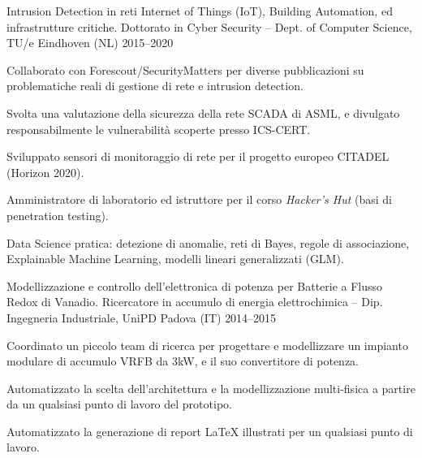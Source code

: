 
\begin{cventries}
    \cventry%
        {Intrusion Detection in reti Internet of Things (IoT), Building Automation, ed infrastrutture critiche.} %
        {Dottorato in Cyber Security -- Dept. of Computer Science, TU/e} %
        {Eindhoven (NL)} %
        {2015--2020} %
        {\begin{cvitems}
            \item Collaborato con Forescout/SecurityMatters per diverse pubblicazioni su problematiche reali di gestione di rete e intrusion detection.
            \item Svolta una valutazione della sicurezza della rete SCADA di ASML, e divulgato responsabilmente le vulnerabilità scoperte presso ICS-CERT.
            \item Sviluppato sensori di monitoraggio di rete per il progetto europeo CITADEL (Horizon 2020).
            \item Amministratore di laboratorio ed istruttore per il corso \emph{Hacker's Hut} (basi di penetration testing).
            \item Data Science pratica: detezione di anomalie, reti di Bayes, regole di associazione, Explainable Machine Learning, modelli lineari generalizzati (GLM).
        \end{cvitems}}


    \cventry%
        {Modellizzazione e controllo dell'elettronica di potenza per Batterie a Flusso Redox di Vanadio.}
        {Ricercatore in accumulo di energia elettrochimica -- Dip. Ingegneria Industriale, UniPD}
        {Padova (IT)}
        {2014--2015}
        {\begin{cvitems}
            \item Coordinato un piccolo team di ricerca per progettare e modellizzare un impianto modulare di accumulo VRFB da 3kW, e il suo convertitore di potenza.
            \item Automatizzato la scelta dell'architettura e la modellizzazione multi-fisica a partire da un qualsiasi punto di lavoro del prototipo.
            \item Automatizzato la generazione di report LaTeX illustrati per un qualsiasi punto di lavoro.
        \end{cvitems}}


\end{cventries}
